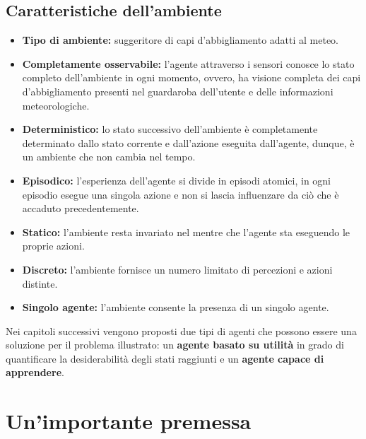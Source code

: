 \documentclass[a4paper, 11pt, oneside]{report}
\begin{document}
            \subsection{Caratteristiche dell'ambiente}
                \begin{itemize}
                    \item \textbf{Tipo di ambiente:} suggeritore di capi d'abbigliamento adatti al meteo.
                    \item \textbf{Completamente osservabile:} l'agente attraverso i sensori conosce lo stato
                    completo dell'ambiente in ogni momento, ovvero, ha visione completa dei capi d'abbigliamento presenti
                    nel guardaroba dell'utente e delle informazioni meteorologiche.
                    \item \textbf{Deterministico:} lo stato successivo dell'ambiente è completamente determinato dallo
                    stato corrente e dall'azione eseguita dall'agente, dunque, è un ambiente che non cambia nel tempo.
                    \item \textbf{Episodico:} l'esperienza dell'agente si divide in episodi atomici, in ogni episodio
                    esegue una singola azione e non si lascia influenzare da ciò che è accaduto precedentemente.
                    \item \textbf{Statico:} l'ambiente resta invariato nel mentre che l'agente sta eseguendo le proprie azioni.
                    \item \textbf{Discreto:} l'ambiente fornisce un numero limitato di percezioni e azioni distinte.
                    \item \textbf{Singolo agente:} l'ambiente consente la presenza di un singolo agente.
                \end{itemize}
                \medskip
                \par \noindent Nei capitoli successivi vengono proposti due tipi di agenti che possono essere una soluzione per il problema illustrato:
                 un \textbf{agente basato su utilità} in grado di quantificare la desiderabilità
                degli stati raggiunti e un \textbf{agente capace di apprendere}.
    \bigskip
    \section{Un'importante premessa}
    \label{sec:premessa}
\end{document}
